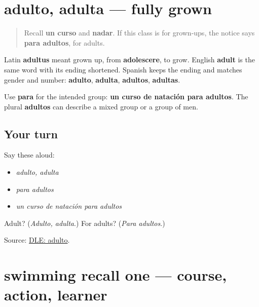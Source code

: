 \section[adulto, adulta]{adulto, adulta — fully grown}

\label{lesson:ES-C417-adulto}



\begin{quote}
Recall \textbf{un curso} and \textbf{nadar}. If this class is for grown-ups, the notice says \textbf{para adultos}, for adults.
\end{quote}

\begin{cousinweb}
Latin \textbf{adultus} meant grown up, from \textbf{adolescere}, to grow. English \textbf{adult} is the same word with its ending shortened. Spanish keeps the ending and matches gender and number: \textbf{adulto}, \textbf{adulta}, \textbf{adultos}, \textbf{adultas}.
\end{cousinweb}

\begin{grammarlens}[title={Grammar Lens: say who it is for}]
Use \textbf{para} for the intended group: \textbf{un curso de natación para adultos}. The plural \textbf{adultos} can describe a mixed group or a group of men.
\end{grammarlens}

\subsection*{Your turn}
Say these aloud:

\begin{itemize}
\raggedright
  \item \emph{adulto, adulta}
  \item \emph{para adultos}
  \item \emph{un curso de natación para adultos}
\end{itemize}

\begin{tcolorbox}[breakable,colback=teal!4,colframe=teal!35!black,title={Before you move on}]
Adult? (\emph{Adulto, adulta}.) For adults? (\emph{Para adultos}.)

Source: \href{https://dle.rae.es/adulto}{DLE: adulto}.
\end{tcolorbox}
\section[(review)]{swimming recall one — course, action, learner}

